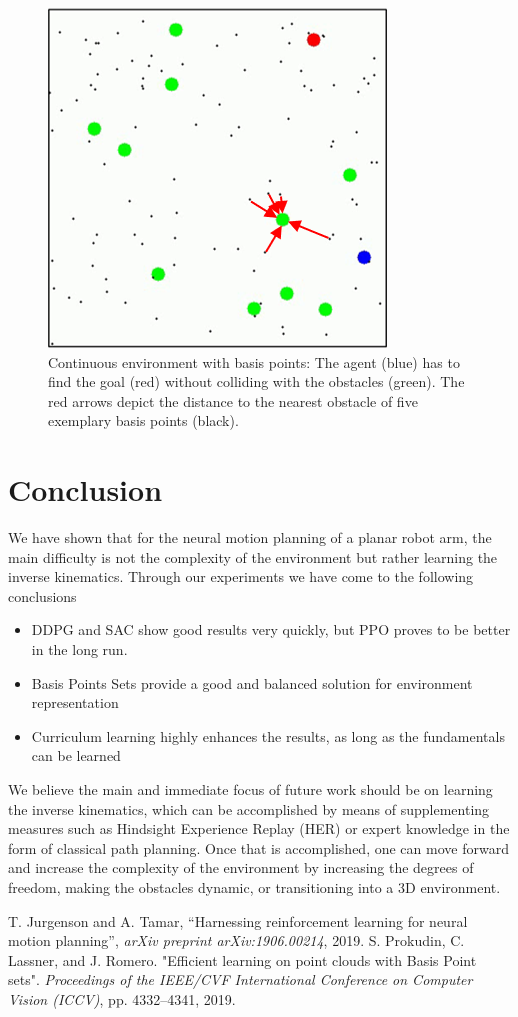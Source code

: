\documentclass[conference]{IEEEtran}
\begin{document}
\begin{figure}[htbp]
\centerline{\includegraphics{bps.png}}
\caption{Continuous environment with basis points: The agent (blue) has to find the goal (red) without colliding with the obstacles (green). The red arrows depict the distance to the nearest obstacle of five exemplary basis points (black).}
\label{fig1}
\end{figure}

\section{Conclusion} 

We have shown that for the neural motion planning of a planar robot arm, the main difficulty is not the complexity of the environment but rather learning the inverse kinematics. Through our experiments we have come to the following conclusions
 \begin{itemize}
\item DDPG and SAC show good results very quickly, but PPO proves to be better in the long run.
\item Basis Points Sets provide a good and balanced solution for environment representation
\item Curriculum learning highly enhances the results, as long as the fundamentals can be learned
\end{itemize}
We believe the main and immediate focus of future work should be on learning the inverse kinematics, which can be accomplished by means of supplementing measures such as Hindsight Experience Replay (HER) or expert knowledge in the form of classical path planning. Once that is accomplished, one can move forward and increase the complexity of the environment by increasing the degrees of freedom, making the obstacles dynamic, or transitioning into a 3D environment.


\begin{thebibliography}{00}
 T. Jurgenson and A. Tamar, ``Harnessing reinforcement learning for neural
motion planning'',  \textit{arXiv preprint arXiv:1906.00214}, 2019.
 S. Prokudin, C. Lassner, and J. Romero. "Efficient learning on point clouds with Basis Point sets". \textit{Proceedings of the IEEE/CVF International Conference on Computer Vision (ICCV)}, pp. 4332–4341, 2019.
\end{thebibliography}
\end{document}
